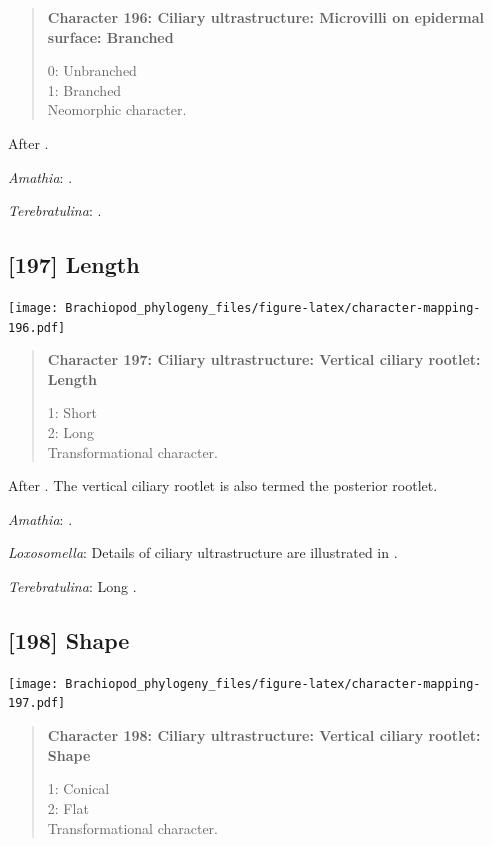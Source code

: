 \documentclass[openany]{book}
\begin{document}
\begin{quote}
\textbf{Character 196: Ciliary ultrastructure: Microvilli on epidermal
surface: Branched}

0: Unbranched\\
1: Branched\\
Neomorphic character.
\end{quote}

After \citet{Lundin2009}.

\hypertarget{Amathia-coding-196}{}
\emph{Amathia}: \citet{Reed1982}.

\hypertarget{Terebratulina-coding-196}{}
\emph{Terebratulina}: \citep{Luter1995}.

\subsection*{{[}197{]} Length}\label{length}

\texttt{[image: Brachiopod\_phylogeny\_files/figure-latex/character-mapping-196.pdf]}

\begin{quote}
\textbf{Character 197: Ciliary ultrastructure: Vertical ciliary rootlet:
Length}

1: Short\\
2: Long\\
Transformational character.
\end{quote}

After \citet{Lundin2009}. The vertical ciliary rootlet is also termed
the posterior rootlet.

\hypertarget{Amathia-coding-197}{}
\emph{Amathia}: \citet{Reed1982}.

\hypertarget{Loxosomella-coding-197}{}
\emph{Loxosomella}: Details of ciliary ultrastructure are illustrated in
\citet{Nielsen1976}.

\hypertarget{Terebratulina-coding-197}{}
\emph{Terebratulina}: Long \citep{Luter1995}.

\subsection*{{[}198{]} Shape}\label{shape}

\texttt{[image: Brachiopod\_phylogeny\_files/figure-latex/character-mapping-197.pdf]}

\begin{quote}
\textbf{Character 198: Ciliary ultrastructure: Vertical ciliary rootlet:
Shape}

1: Conical\\
2: Flat\\
Transformational character.
\end{quote}
\end{document}

